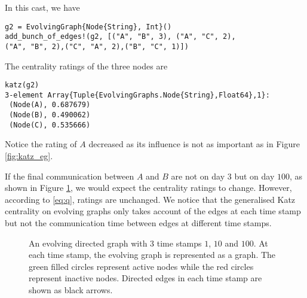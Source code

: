\documentclass[12pt]{article}
\theoremstyle{definition}
\begin{document}
In this cast, we have
\begin{lstlisting}
g2 = EvolvingGraph{Node{String}, Int}()
add_bunch_of_edges!(g2, [("A", "B", 3), ("A", "C", 2),
("A", "B", 2),("C", "A", 2),("B", "C", 1)])
\end{lstlisting}

The centrality ratings of the three nodes are

\begin{lstlisting}
katz(g2)
3-element Array{Tuple{EvolvingGraphs.Node{String},Float64},1}:
 (Node(A), 0.687679)
 (Node(B), 0.490062)
 (Node(C), 0.535666)
\end{lstlisting}

Notice the rating of $A$ decreased as its influence is not as important as in Figure \ref{fig:katz_eg}.

If the final communication between $A$ and $B$ are not on day $3$ but on day $100$, as shown in Figure \ref{fig:katz_eg3},
we would expect the centrality ratings to change. However, according to \eqref{eq:q}, ratings are unchanged.
We notice that the generalised Katz centrality on evolving graphs only takes account of the edges at each time stamp but not the communication time between edges at different time stamps.


\begin{figure}[h]
 \begin{center}
\end{center}
\caption{An evolving directed graph with 3 time stamps $1$, $10$ and $100$.
At each time stamp, the evolving graph is represented as a graph.
The green filled circles represent active nodes while the red circles represent
inactive nodes. Directed edges in each time stamp are shown as black arrows.}
\label{fig:katz_eg3}
\end{figure}
\end{document}
